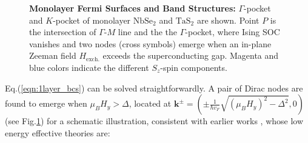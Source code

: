 \begin{figure}
{    }
    \caption{{\bf Monolayer Fermi Surfaces and Band Structures:} $\Gamma$-pocket and $K$-pocket of monolayer $\mathrm{NbSe_2}$ and $\mathrm{TaS_2}$ are shown. Point $P$ is the intersection of $\Gamma$-$M$ line and the the $\Gamma$-pocket, where Ising SOC vanishes and two nodes (cross symbols) emerge when an in-plane Zeeman field $H_{\text{exch.}}$ exceeds the superconducting gap. Magenta and blue colors indicate the different $S_z$-spin components.}
    \label{fig: monolayer FS}
\end{figure}
Eq.(\ref{eqn:1layer_bcs}) can be solved straightforwardly. A pair of Dirac nodes are found to emerge when $\mu_B H_y>\Delta$, located at $\bm k^{\pm}=(\pm \frac{1}{\hbar v_F} \sqrt{(\mu_B H_y)^2-\Delta^2},0)$ (see Fig.\ref{fig: monolayer FS}) for a schematic illustration, consistent with earlier works \cite{he2018magnetic,shaffer2020crystalline}, whose low energy effective theories are:
